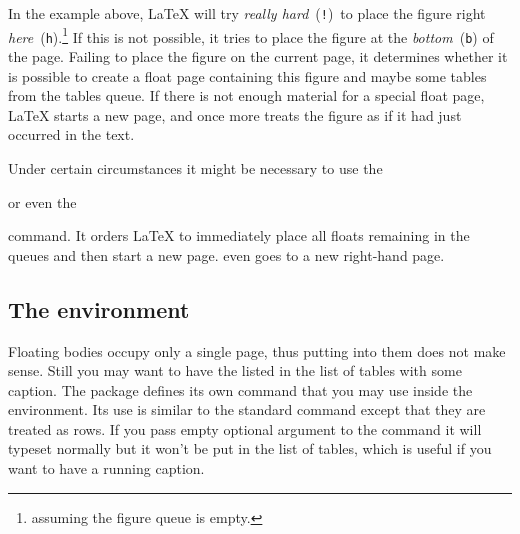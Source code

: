 \noindent In the example above,
\LaTeX{} will try \emph{really hard}~(\texttt{!})\ to place the figure
right \emph{here}~(\texttt{h}).\footnote{assuming the figure queue is
  empty.} If this is not possible, it tries to place the figure at the
\emph{bottom}~(\texttt{b}) of the page.  Failing to place the figure
on the current page, it determines whether it is possible to create a float
page containing this figure and maybe some tables from the tables
queue. If there is not enough material for a special float page,
\LaTeX{} starts a new page, and once more treats the figure as if it
had just occurred in the text.

Under certain circumstances it might be necessary to use the

\begin{lscommand}
 or even the 
\end{lscommand}

\noindent command. It orders \LaTeX{} to immediately place all
floats remaining in the queues and then start a new
page.  even goes to a new right-hand page.

\subsection{The  environment}

Floating bodies occupy only a single page, thus putting  into
them does not make sense. Still you may want to have the  listed
in the list of tables with some caption. The  package defines
its own  command that you may use inside the environment. Its use
is similar to the standard  command except that they are treated as
rows. If you pass empty optional argument to the  command it will
typeset normally but it won't be put in the list of tables, which is useful if
you want to have a running caption.


